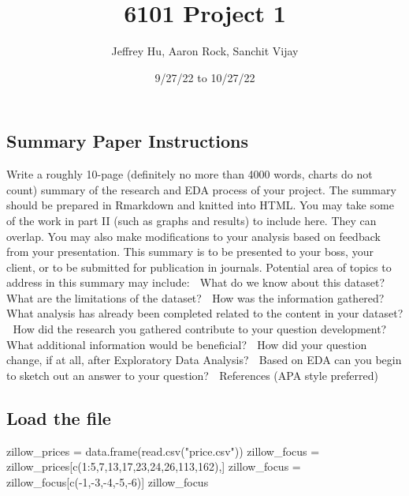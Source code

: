 \documentclass[
]{article}
\title{6101 Project 1}
\author{Jeffrey Hu, Aaron Rock, Sanchit Vijay}
\date{9/27/22 to 10/27/22}
\newenvironment{Shaded}{\begin{snugshade}}{\end{snugshade}}
\newcommand{\DecValTok}[1]{\textcolor[rgb]{0.00,0.00,0.81}{#1}}
\newcommand{\FunctionTok}[1]{\textcolor[rgb]{0.00,0.00,0.00}{#1}}
\newcommand{\NormalTok}[1]{#1}
\newcommand{\OtherTok}[1]{\textcolor[rgb]{0.56,0.35,0.01}{#1}}
\newcommand{\SpecialCharTok}[1]{\textcolor[rgb]{0.00,0.00,0.00}{#1}}
\newcommand{\StringTok}[1]{\textcolor[rgb]{0.31,0.60,0.02}{#1}}
\begin{document}
\maketitle

{
\setcounter{tocdepth}{3}
\tableofcontents
}
\hypertarget{summary-paper-instructions}{%
\subsection{Summary Paper
Instructions}\label{summary-paper-instructions}}

Write a roughly 10-page (definitely no more than 4000 words, charts do
not count) summary of the research and EDA process of your project. The
summary should be prepared in Rmarkdown and knitted into HTML. You may
take some of the work in part II (such as graphs and results) to include
here. They can overlap. You may also make modifications to your analysis
based on feedback from your presentation. This summary is to be
presented to your boss, your client, or to be submitted for publication
in journals. Potential area of topics to address in this summary may
include:  What do we know about this dataset?  What are the
limitations of the dataset?  How was the information gathered?  What
analysis has already been completed related to the content in your
dataset?  How did the research you gathered contribute to your question
development?  What additional information would be beneficial?  How
did your question change, if at all, after Exploratory Data Analysis? 
Based on EDA can you begin to sketch out an answer to your question? 
References (APA style preferred)

\hypertarget{load-the-file}{%
\subsection{Load the file}\label{load-the-file}}

\begin{Shaded}
\begin{Highlighting}[]
\NormalTok{zillow\_prices }\OtherTok{=} \FunctionTok{data.frame}\NormalTok{(}\FunctionTok{read.csv}\NormalTok{(}\StringTok{"price.csv"}\NormalTok{))}
\NormalTok{zillow\_focus }\OtherTok{=}\NormalTok{ zillow\_prices[}\FunctionTok{c}\NormalTok{(}\DecValTok{1}\SpecialCharTok{:}\DecValTok{5}\NormalTok{,}\DecValTok{7}\NormalTok{,}\DecValTok{13}\NormalTok{,}\DecValTok{17}\NormalTok{,}\DecValTok{23}\NormalTok{,}\DecValTok{24}\NormalTok{,}\DecValTok{26}\NormalTok{,}\DecValTok{113}\NormalTok{,}\DecValTok{162}\NormalTok{),]}
\NormalTok{zillow\_focus }\OtherTok{=}\NormalTok{ zillow\_focus[}\FunctionTok{c}\NormalTok{(}\SpecialCharTok{{-}}\DecValTok{1}\NormalTok{,}\SpecialCharTok{{-}}\DecValTok{3}\NormalTok{,}\SpecialCharTok{{-}}\DecValTok{4}\NormalTok{,}\SpecialCharTok{{-}}\DecValTok{5}\NormalTok{,}\SpecialCharTok{{-}}\DecValTok{6}\NormalTok{)]}
\NormalTok{zillow\_focus}
\end{Highlighting}
\end{Shaded}
\end{document}

